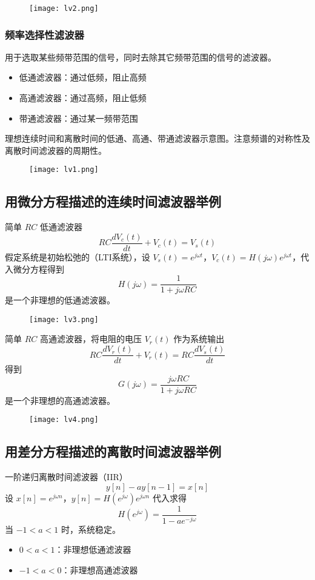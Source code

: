 \documentclass[UTF8]{report}
\theoremstyle{MyLineTheoremStyle} %
\theoremstyle{MyBlockTheoremStyle} %
\theoremstyle{MySubsubsectionStyle} %
\begin{document}
\begin{figure}[H]
    \centering
    \texttt{[image: lv2.png]} %
\end{figure}

\subsubsection{频率选择性滤波器}
用于选取某些频带范围的信号，同时去除其它频带范围的信号的滤波器。
\begin{itemize}
    \item 低通滤波器：通过低频，阻止高频
    \item 高通滤波器：通过高频，阻止低频
    \item 带通滤波器：通过某一频带范围
\end{itemize}
理想连续时间和离散时间的低通、高通、带通滤波器示意图。注意频谱的对称性及离散时间滤波器的周期性。

\begin{figure}[H]
    \centering
    \texttt{[image: lv1.png]} %
\end{figure}

\subsection{用微分方程描述的连续时间滤波器举例}
简单 $RC$ 低通滤波器
\[
RC \frac{dV_c(t)}{dt} + V_c(t) = V_s(t)
\]
假定系统是初始松弛的（LTI系统），设 $V_s(t) = e^{j\omega t}$，$V_c(t) = H(j\omega) e^{j\omega t}$，代入微分方程得到
\[
H(j\omega) = \frac{1}{1 + j\omega RC}
\]
是一个非理想的低通滤波器。

\begin{figure}[H]
    \centering
    \texttt{[image: lv3.png]} %
\end{figure}

简单 $RC$ 高通滤波器，将电阻的电压 $V_r(t)$ 作为系统输出
\[
RC \frac{dV_r(t)}{dt} + V_r(t) = RC \frac{dV_s(t)}{dt}
\]
得到
\[
G(j\omega) = \frac{j\omega RC}{1 + j\omega RC}
\]
是一个非理想的高通滤波器。

\begin{figure}[H]
    \centering
    \texttt{[image: lv4.png]} %
\end{figure}

\subsection{用差分方程描述的离散时间滤波器举例}
一阶递归离散时间滤波器（IIR）
\[
y[n] - ay[n-1] = x[n]
\]
设 $x[n] = e^{j\omega n}$，$y[n] = H(e^{j\omega}) e^{j\omega n}$ 代入求得
\[
H(e^{j\omega}) = \frac{1}{1 - ae^{-j\omega}}
\]
当 $-1 < a < 1$ 时，系统稳定。
\begin{itemize}
    \item $0 < a < 1$：非理想低通滤波器
    \item $-1 < a < 0$：非理想高通滤波器
\end{itemize}
\end{document}

